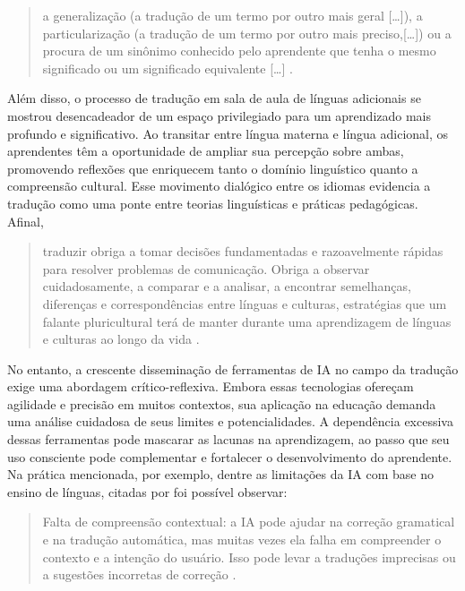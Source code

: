 \documentclass[portuguese]{textolivre}
\begin{document}
\begin{quote}
a generalização (a tradução de um termo por outro mais geral […]), a particularização (a tradução de um termo por outro mais preciso,[…]) ou a procura de um sinônimo conhecido pelo aprendente que tenha o mesmo significado ou um significado equivalente […] \cite[p. 5, tradução nossa]{alcarazo2014}.
\end{quote}

Além disso, o processo de tradução em sala de aula de línguas adicionais se mostrou desencadeador de um espaço privilegiado para um aprendizado mais profundo e significativo. Ao transitar entre língua materna e língua adicional, os aprendentes têm a oportunidade de ampliar sua percepção sobre ambas, promovendo reflexões que enriquecem tanto o domínio linguístico quanto a compreensão cultural. Esse movimento dialógico entre os idiomas evidencia a tradução como uma ponte entre teorias linguísticas e práticas pedagógicas. Afinal,

\begin{quote}
traduzir obriga a tomar decisões fundamentadas e razoavelmente rápidas para resolver problemas de comunicação. Obriga a observar cuidadosamente, a comparar e a analisar, a encontrar semelhanças, diferenças e correspondências entre línguas e culturas, estratégias que um falante pluricultural terá de manter durante uma aprendizagem de línguas e culturas ao longo da vida \cite[p. 68, tradução nossa]{mendo2009}.
\end{quote}

No entanto, a crescente disseminação de ferramentas de IA no campo da tradução exige uma abordagem crítico-reflexiva. Embora essas tecnologias ofereçam agilidade e precisão em muitos contextos, sua aplicação na educação demanda uma análise cuidadosa de seus limites e potencialidades. A dependência excessiva dessas ferramentas pode mascarar as lacunas na aprendizagem, ao passo que seu uso consciente pode complementar e fortalecer o desenvolvimento do aprendente. Na prática mencionada, por exemplo, dentre as limitações da IA com base no ensino de línguas, citadas por \textcite{desposito2024} foi possível observar:

\begin{quote}
Falta de compreensão contextual: a IA pode ajudar na correção gramatical e na tradução automática, mas muitas vezes ela falha em compreender o contexto e a intenção do usuário. Isso pode levar a traduções imprecisas ou a sugestões incorretas de correção \cite [p. 147]{desposito2024}.
\end{quote}
\end{document}

